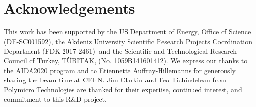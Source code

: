 \documentclass[a4paper,11pt]{article}
\begin{document}


\section{Acknowledgements}
This work has been supported by the US Department of Energy, Office of Science (DE-SC001592), the Akdeniz University Scientific Research Projects Coordination Department (FDK-2017-2461), and the Scientific and Technological Research Council of Turkey, T\"UBITAK, (No. 1059B141601412).  We express our thanks to the AIDA2020 program and to Etiennette Auffray-Hillemanns for generously sharing the beam time at CERN.  Jim Clarkin and Teo Tichindelean from Polymicro Technologies are thanked for their expertise, continued interest, and commitment to this R\&D project.




\end{document}
